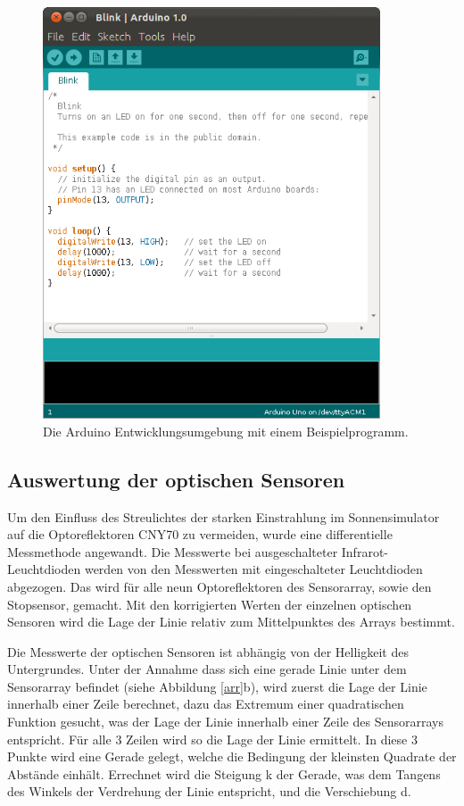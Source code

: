 \documentclass[a4paper,bibtotoc,oneside]{scrbook}
\begin{document}
\begin{figure}[htbp]
\centering
\includegraphics[width=100mm]{img/Arduino.png}
\caption{Die Arduino Entwicklungsumgebung mit einem Beispielprogramm.}\label{ardu2}
\end{figure}

\subsection{Auswertung der optischen Sensoren}\thispagestyle{empty}
Um den Einfluss des Streulichtes der starken Einstrahlung im Sonnensimulator auf die Optoreflektoren CNY70 zu vermeiden, wurde eine differentielle Messmethode angewandt. Die Messwerte bei ausgeschalteter Infrarot-Leuchtdioden werden von den Messwerten mit eingeschalteter Leuchtdioden abgezogen.
Das wird für alle neun Optoreflektoren des Sensorarray, sowie den Stopsensor, gemacht.
Mit den korrigierten Werten der einzelnen optischen Sensoren wird die Lage der Linie relativ zum Mittelpunktes des Arrays bestimmt. 

\noindent Die Messwerte der optischen Sensoren ist abhängig von der Helligkeit des Untergrundes. Unter der Annahme dass sich eine gerade Linie unter dem Sensorarray befindet (siehe Abbildung \ref{arr}b), wird zuerst die Lage der Linie innerhalb einer Zeile berechnet, dazu das Extremum einer quadratischen Funktion gesucht, was der Lage der Linie innerhalb einer Zeile des Sensorarrays entspricht. 
Für alle 3 Zeilen wird so die Lage der Linie ermittelt. In diese 3 Punkte wird eine Gerade gelegt, welche die Bedingung der kleinsten Quadrate der Abstände einhält. Errechnet wird die Steigung k der Gerade, was dem Tangens des Winkels der Verdrehung der Linie entspricht, und die Verschiebung d.
 
\end{document}
